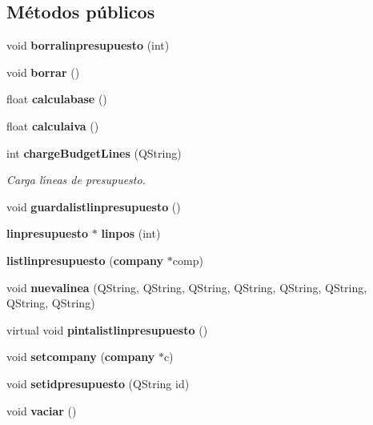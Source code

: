 \subsection*{M\'{e}todos p\'{u}blicos}
\begin{CompactItemize}
\item 
void {\bf borralinpresupuesto} (int)\label{classlistlinpresupuesto_a0}

\item 
void {\bf borrar} ()\label{classlistlinpresupuesto_a1}

\item 
float {\bf calculabase} ()\label{classlistlinpresupuesto_a2}

\item 
float {\bf calculaiva} ()\label{classlistlinpresupuesto_a3}

\item 
int {\bf charge\-Budget\-Lines} (QString)
\begin{CompactList}\small\item\em Carga l\'{\i}neas de presupuesto. \item\end{CompactList}\item 
void {\bf guardalistlinpresupuesto} ()\label{classlistlinpresupuesto_a5}

\item 
{\bf linpresupuesto} $\ast$ {\bf linpos} (int)\label{classlistlinpresupuesto_a6}

\item 
{\bf listlinpresupuesto} ({\bf company} $\ast$comp)\label{classlistlinpresupuesto_a8}

\item 
void {\bf nuevalinea} (QString, QString, QString, QString, QString, QString, QString, QString)\label{classlistlinpresupuesto_a9}

\item 
virtual void {\bf pintalistlinpresupuesto} ()\label{classlistlinpresupuesto_a10}

\item 
void {\bf setcompany} ({\bf company} $\ast$c)\label{classlistlinpresupuesto_a11}

\item 
void {\bf setidpresupuesto} (QString id)\label{classlistlinpresupuesto_a12}

\item 
void {\bf vaciar} ()\label{classlistlinpresupuesto_a13}

\end{CompactItemize}
